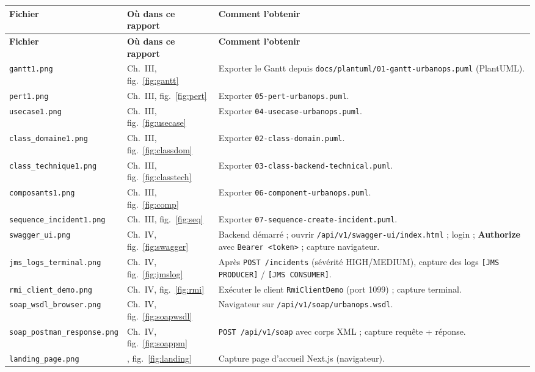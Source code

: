 \documentclass[12pt,a4paper,twoside,openany]{book}
\begin{document}
{\small
\begin{longtable}{@{}p{3.05cm} p{3.35cm} >{\RaggedRight\arraybackslash}p{8.65cm}@{}}
  \toprule
  \textbf{Fichier} & \textbf{Où dans ce rapport} & \textbf{Comment l'obtenir} \\
  \midrule
  \endfirsthead
  \toprule
  \textbf{Fichier} & \textbf{Où dans ce rapport} & \textbf{Comment l'obtenir} \\
  \midrule
  \endhead
  \texttt{gantt1.png} & Ch.~III, fig.~\ref{fig:gantt} & Exporter le Gantt depuis \texttt{docs/plantuml/01-gantt-urbanops.puml} (PlantUML). \\
  \texttt{pert1.png} & Ch.~III, fig.~\ref{fig:pert} & Exporter \texttt{05-pert-urbanops.puml}. \\
  \texttt{usecase1.png} & Ch.~III, fig.~\ref{fig:usecase} & Exporter \texttt{04-usecase-urbanops.puml}. \\
  \texttt{class\_domaine1.png} & Ch.~III, fig.~\ref{fig:classdom} & Exporter \texttt{02-class-domain.puml}. \\
  \texttt{class\_technique1.png} & Ch.~III, fig.~\ref{fig:classtech} & Exporter \texttt{03-class-backend-technical.puml}. \\
  \texttt{composants1.png} & Ch.~III, fig.~\ref{fig:comp} & Exporter \texttt{06-component-urbanops.puml}. \\
  \texttt{sequence\_incident1.png} & Ch.~III, fig.~\ref{fig:seq} & Exporter \texttt{07-sequence-create-incident.puml}. \\
  \texttt{swagger\_ui.png} & Ch.~IV, fig.~\ref{fig:swagger} & Backend démarré ; ouvrir \texttt{/api/v1/swagger-ui/index.html} ; login ; \textbf{Authorize} avec \texttt{Bearer <token>} ; capture navigateur. \\
  \texttt{jms\_logs\_terminal.png} & Ch.~IV, fig.~\ref{fig:jmslog} & Après \texttt{POST /incidents} (sévérité HIGH/MEDIUM), capture des logs \texttt{[JMS PRODUCER]} / \texttt{[JMS CONSUMER]}. \\
  \texttt{rmi\_client\_demo.png} & Ch.~IV, fig.~\ref{fig:rmi} & Exécuter le client \texttt{RmiClientDemo} (port 1099) ; capture terminal. \\
  \texttt{soap\_wsdl\_browser.png} & Ch.~IV, fig.~\ref{fig:soapwsdl} & Navigateur sur \texttt{/api/v1/soap/urbanops.wsdl}. \\
  \texttt{soap\_postman\_response.png} & Ch.~IV, fig.~\ref{fig:soappm} & \texttt{POST /api/v1/soap} avec corps XML ; capture requête + réponse. \\
  \texttt{landing\_page.png} & \nameref{chap:front}, fig.~\ref{fig:landing} & Capture page d'accueil Next.js (navigateur). \\

\end{longtable}}
\end{document}
